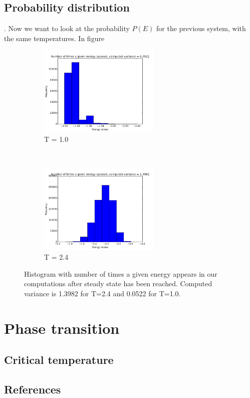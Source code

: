 \documentclass{article}
\begin{document}
\subsection*{Probability distribution}.
Now we want to look at the probability $P(E)$ for the previous system, with the same temperatures. In figure 
\begin{figure}[t!]
    \centering
    \begin{subfigure}[t]{0.6\textwidth}
        \centering
        \includegraphics[height=1.7in]{4dT1.png}
        \caption{T = 1.0}
    \end{subfigure}%
    ~ 
    \begin{subfigure}[t]{0.6\textwidth}
        \centering
        \includegraphics[height=1.7in]{4dT24.png}
        \caption{T = 2.4}
    \end{subfigure}
    \caption{Histogram with number of times a given energy appears in our computations after steady state has been reached. Computed variance is 1.3982 for T=2.4 and 0.0522 for T=1.0.}
\end{figure}


\section*{Phase transition}
\subsection*{Critical temperature}
\subsection*{References}
\end{document}
